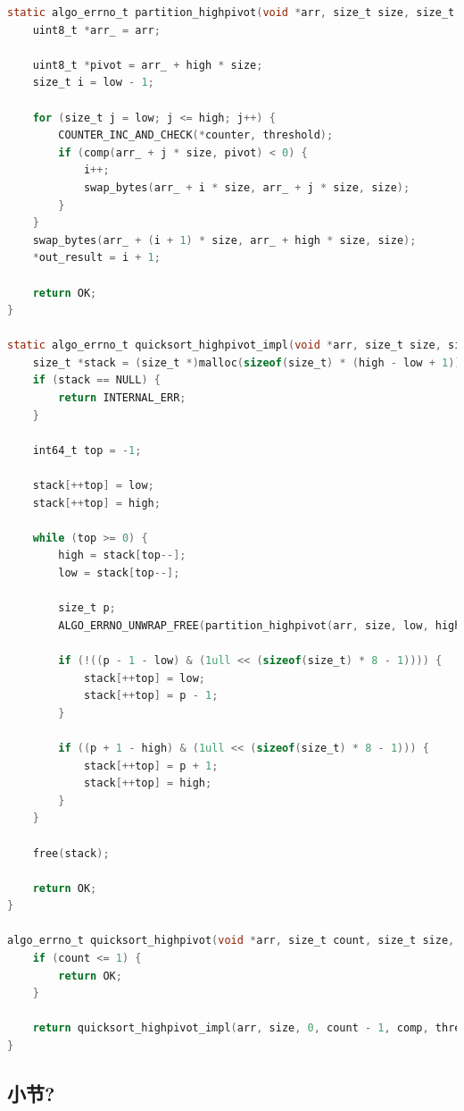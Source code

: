 \documentclass[a4paper]{article}
\begin{document}
\begin{lstlisting}[language=C]
static algo_errno_t partition_highpivot(void *arr, size_t size, size_t low, size_t high, comp_t comp, uint64_t threshold, uint64_t *counter, size_t *out_result) {
    uint8_t *arr_ = arr;

    uint8_t *pivot = arr_ + high * size;
    size_t i = low - 1;

    for (size_t j = low; j <= high; j++) {
        COUNTER_INC_AND_CHECK(*counter, threshold);
        if (comp(arr_ + j * size, pivot) < 0) {
            i++;
            swap_bytes(arr_ + i * size, arr_ + j * size, size);
        }
    }
    swap_bytes(arr_ + (i + 1) * size, arr_ + high * size, size);
    *out_result = i + 1;

    return OK;
}

static algo_errno_t quicksort_highpivot_impl(void *arr, size_t size, size_t low, size_t high, comp_t comp, uint64_t threshold, uint64_t *counter) {
    size_t *stack = (size_t *)malloc(sizeof(size_t) * (high - low + 1));
    if (stack == NULL) {
        return INTERNAL_ERR;
    }
    
    int64_t top = -1;

    stack[++top] = low;
    stack[++top] = high;

    while (top >= 0) {
        high = stack[top--];
        low = stack[top--];

        size_t p;
        ALGO_ERRNO_UNWRAP_FREE(partition_highpivot(arr, size, low, high, comp, threshold, counter, &p), stack);

        if (!((p - 1 - low) & (1ull << (sizeof(size_t) * 8 - 1)))) {
            stack[++top] = low;
            stack[++top] = p - 1;
        }

        if ((p + 1 - high) & (1ull << (sizeof(size_t) * 8 - 1))) {
            stack[++top] = p + 1;
            stack[++top] = high;
        }
    }

    free(stack);

    return OK;
}

algo_errno_t quicksort_highpivot(void *arr, size_t count, size_t size, comp_t comp, uint64_t threshold, uint64_t *out_counter) {
    if (count <= 1) {
        return OK;
    }

    return quicksort_highpivot_impl(arr, size, 0, count - 1, comp, threshold, out_counter);
}
\end{lstlisting}

\subsection{小节?}
\end{document}
